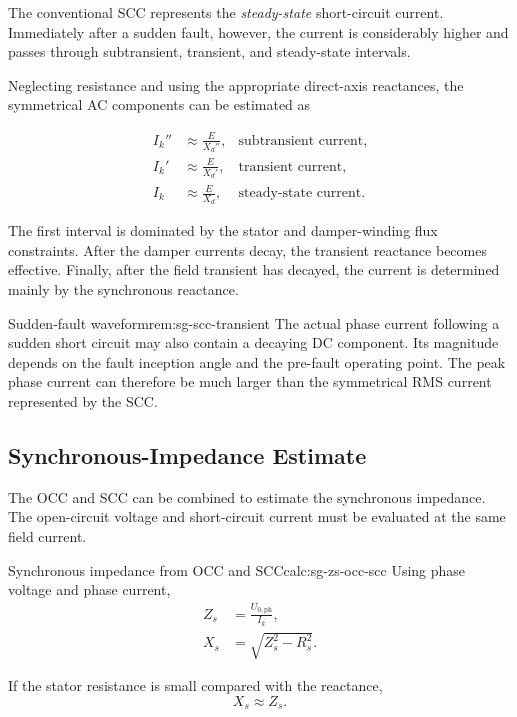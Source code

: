 The conventional SCC represents the \emph{steady-state} short-circuit current.
Immediately after a sudden fault, however, the current is considerably higher
and passes through subtransient, transient, and steady-state intervals.

Neglecting resistance and using the appropriate direct-axis reactances, the
symmetrical AC components can be estimated as

\begin{align}
  I_k'' &\approx \frac{E}{X_d''},
  & \text{subtransient current}, \\
  I_k'  &\approx \frac{E}{X_d'},
  & \text{transient current}, \\
  I_k   &\approx \frac{E}{X_d},
  & \text{steady-state current}.
  \label{eq:sg-fault-current-stages}
\end{align}

The first interval is dominated by the stator and damper-winding flux
constraints. After the damper currents decay, the transient reactance becomes
effective. Finally, after the field transient has decayed, the current is
determined mainly by the synchronous reactance.

\begin{remark}{Sudden-fault waveform}{rem:sg-scc-transient}
The actual phase current following a sudden short circuit may also contain a
decaying DC component. Its magnitude depends on the fault inception angle and
the pre-fault operating point. The peak phase current can therefore be much
larger than the symmetrical RMS current represented by the SCC.
\end{remark}

\subsection{Synchronous-Impedance Estimate}

The OCC and SCC can be combined to estimate the synchronous impedance. The
open-circuit voltage and short-circuit current must be evaluated at the same
field current.

\begin{calculation}{Synchronous impedance from OCC and SCC}{calc:sg-zs-occ-scc}
Using phase voltage and phase current,
\begin{align}
  Z_s &= \frac{U_{0,\mathrm{ph}}}{I_k}, \\
  X_s &= \sqrt{Z_s^2-R_s^2}.
\end{align}

If the stator resistance is small compared with the reactance,
\begin{equation}
  X_s\approx Z_s.
\end{equation}
\end{calculation}

